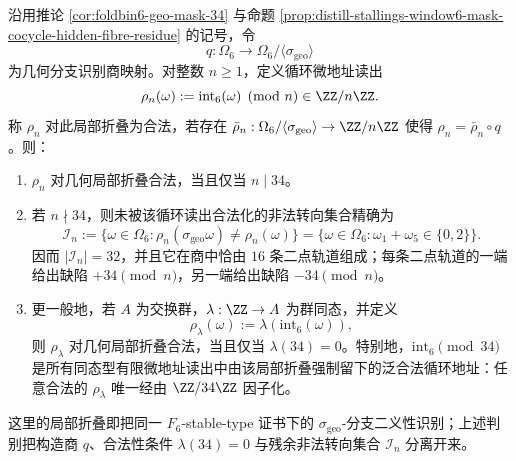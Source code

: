 \begin{theorem}[几何局部折叠后循环地址读出的合法化判别]\label{distill:stallings_foldings_and_bestvina_handel_train_tracks-illegal_turn_elimination_and_train_track_normal_form-cyclic-address-legality}
沿用推论 \ref{cor:foldbin6-geo-mask-34} 与命题 \ref{prop:distill-stallings-window6-mask-cocycle-hidden-fibre-residue} 的记号，令
\[
q:\Omega_6\longrightarrow \Omega_6/\langle\sigma_{\mathrm{geo}}\rangle
\]
为几何分支识别商映射。对整数 \(n\ge1\)，定义循环微地址读出
\[
\rho_n(\omega):=\mathrm{int}_6(\omega)\pmod n\in\ZZ/n\ZZ.
\]
称 \(\rho_n\) 对此局部折叠为合法，若存在 \(\bar\rho_n:\Omega_6/\langle\sigma_{\mathrm{geo}}\rangle\to\ZZ/n\ZZ\) 使得
\(\rho_n=\bar\rho_n\circ q\)。则：
\begin{enumerate}
  \item \(\rho_n\) 对几何局部折叠合法，当且仅当 \(n\mid 34\)。
  \item 若 \(n\nmid 34\)，则未被该循环读出合法化的非法转向集合精确为
  \[
  \mathcal I_n:=\{\omega\in\Omega_6:\rho_n(\sigma_{\mathrm{geo}}\omega)\ne\rho_n(\omega)\}
  =\{\omega\in\Omega_6:\omega_1+\omega_5\in\{0,2\}\}.
  \]
  因而 \(|\mathcal I_n|=32\)，并且它在商中恰由 \(16\) 条二点轨道组成；每条二点轨道的一端给出缺陷 \(+34\pmod n\)，另一端给出缺陷 \(-34\pmod n\)。
  \item 更一般地，若 \(A\) 为交换群，\(\lambda:\ZZ\to A\) 为群同态，并定义
  \[
  \rho_\lambda(\omega):=\lambda(\mathrm{int}_6(\omega)),
  \]
  则 \(\rho_\lambda\) 对几何局部折叠合法，当且仅当 \(\lambda(34)=0\)。特别地，\(\mathrm{int}_6\pmod {34}\) 是所有同态型有限微地址读出中由该局部折叠强制留下的泛合法循环地址：任意合法的 \(\rho_\lambda\) 唯一经由 \(\ZZ/34\ZZ\) 因子化。
\end{enumerate}
这里的局部折叠即把同一 \(F_6\)-stable-type 证书下的 \(\sigma_{\mathrm{geo}}\)-分支二义性识别；上述判别把构造商 \(q\)、合法性条件 \(\lambda(34)=0\) 与残余非法转向集合 \(\mathcal I_n\) 分离开来。
\end{theorem}
